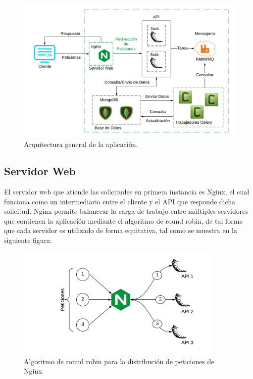 \begin{figure}[H]
	\centering
		\includegraphics[width=1\textwidth]{figures/diagram_general}
	\caption{Arquitectura general de la aplicación.}
	\label{fig:diagram_general}

\end{figure}

\subsection{Servidor Web}

El servidor web que atiende las solicitudes en primera instancia es Nginx,
el cual funciona como un intermediario entre el cliente y el API que responde dicha solicitud.
Nginx permite balancear la carga de trabajo entre múltiples servidores que contienen la aplicación mediante el algoritmo de round robin,
de tal forma que cada servidor es utilizado de forma equitativa, tal como se muestra en la siguiente figura:

\begin{figure}[H]
	\centering
		\includegraphics[width=0.9\textwidth]{figures/round_robin}
	\caption{Algoritmo de round robin para la distribución de peticiones de Nginx.}
	\label{fig:round_robin}
\end{figure}

